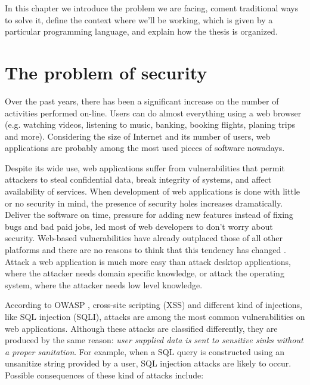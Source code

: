 In this chapter we introduce the problem  we are facing,
coment traditional ways to solve it,
define the context where we'll be working, which is given by
a particular programming language,
and explain how the thesis is organized.

\section*{The problem of security}
Over the past years, there has been a significant increase 
on the number of activities performed on-line.
Users can do almost everything  
using a web browser (e.g. 
watching videos, listening to music, banking, booking flights, planing 
trips and more). Considering the size of Internet and its number of users, 
web applications are probably among the most used pieces of
software nowadays.

Despite its wide use, web applications suffer 
from vulnerabilities that permit attackers to 
steal confidential data, break integrity of systems, 
and affect availability of services. 
When development of web applications is done 
with little or no security in mind,  
the presence of security holes increases dramatically.
Deliver the software on time, pressure for adding new features
instead of fixing bugs and 
bad paid jobs,
led most of web developers to don't worry about security.
Web-based vulnerabilities have already  
outplaced those of all other platforms 
\cite{StateWebSecurity} 
and there are 
no reasons to think that this tendency has changed
\cite{FFAWebSecurity}.
Attack a web application is much more easy than attack 
desktop applications, where the attacker needs domain specific knowledge,
or attack the operating system, where the attacker needs low level knowledge.
\cite{StateWebSecurity}


According to OWASP \cite{OWASP:Top10:2010}, 
cross-site scripting (XSS) and different kind of injections, like
SQL injection (SQLI), attacks are among 
the most common vulnerabilities on web applications.
Although these attacks are classified differently, they are produced 
by the same 
reason: \emph{user supplied data is sent to sensitive sinks 
without a proper sanitation}.
For example, 
when a SQL query is constructed using an unsanitize string provided by a user, 
SQL injection attacks are likely to occur.
Possible consequences of these kind of attacks include:


